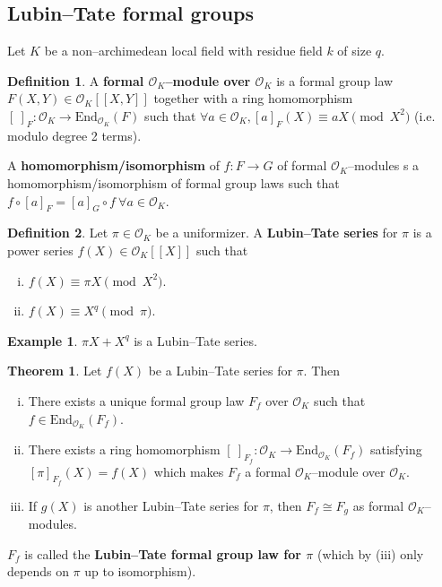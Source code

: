 \documentclass{article}
\theoremstyle{definition}
\newtheorem{theorem}{Theorem}[section]
\newtheorem{example}{Example}[section]
\newtheorem{defn}{Definition}[section]
\begin{document}
\subsection{Lubin--Tate formal groups}
Let $K$ be a non--archimedean local field with residue field $k$ of size $q$.
\begin{defn}
    A \textbf{formal $\mathcal{O}_K$--module over $\mathcal{O}_K$} is a formal group law $F(X,Y) \in \mathcal{O}_K[[X,Y]]$ together with a ring homomorphism $[ ~]_F : \mathcal{O}_K \to \text{End}_{\mathcal{O}_K}(F)$ such that $\forall a \in \mathcal{O}_K, [a]_F(X) \equiv aX \pmod{X^2}$ (i.e. modulo degree 2 terms).
    \vspace{1mm}
     
    A \textbf{homomorphism/isomorphism} of $f: F \to G$ of formal $\mathcal{O}_K$--modules s a homomorphism/isomorphism of formal group laws such that $f \circ [a]_F  = [a]_G \circ f ~\forall a \in \mathcal{O}_K$. 
\end{defn}
\begin{defn}
    Let $\pi \in \mathcal{O}_K$ be a uniformizer. A \textbf{Lubin--Tate series} for $\pi$ is a power series $f(X) \in \mathcal{O}_K[[X]]$ such that
    \begin{enumerate}[(i)]
        \item $f(X) \equiv \pi X \pmod{X^2}$.
        \item $f(X) \equiv X^q \pmod{\pi}$.
    \end{enumerate}
\end{defn}
\begin{example}
    $\pi X + X^q$ is a Lubin--Tate series.
\end{example}
\begin{theorem}\label{theorem18.4}
    Let $f(X)$ be a Lubin--Tate series for $\pi$. Then 
    \begin{enumerate}[(i)]
        \item There exists a unique formal group law $F_f$ over $\mathcal{O}_K$ such that $f \in \text{End}_{\mathcal{O}_K}(F_f)$.
        \item There exists a ring homomorphism $[~]_{F_f}: \mathcal{O}_K \to \text{End}_{\mathcal{O}_K}(F_f)$ satisfying $[\pi]_{F_f}(X)=f(X)$ which makes $F_f$ a formal $\mathcal{O}_K$--module over $\mathcal{O}_K$.
        \item If $g(X)$ is another Lubin--Tate series for $\pi$, then $F_f \cong F_g$ as formal $\mathcal{O}_K$--modules.
    \end{enumerate}
    $F_f$ is called the \textbf{Lubin--Tate formal group law for $\pi$} (which by (iii) only depends on $\pi$ up to isomorphism).
\end{theorem}
\end{document}
